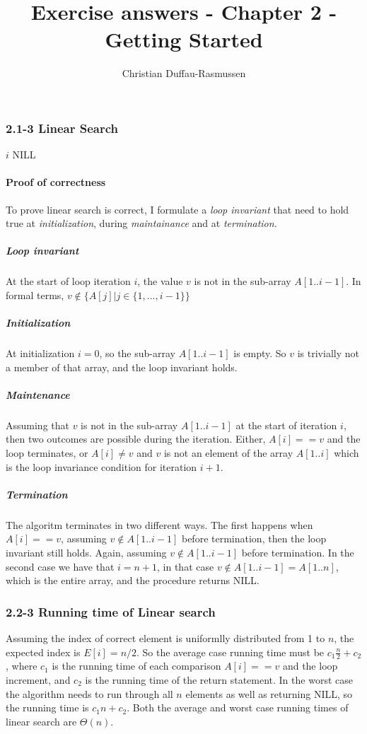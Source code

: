 \documentclass{article}
\title{Exercise answers - Chapter 2 - Getting Started}
\author{Christian Duffau-Rasmussen}
\let\oldReturn\Return
\renewcommand{\Return}{\State\oldReturn}
\begin{document}
\subsubsection*{2.1-3 Linear Search}

\begin{algorithmic}[1]
		\Return $i$
	\EndIf
\EndFor
\Return NILL
\EndProcedure
\end{algorithmic}

\paragraph{Proof of correctness}

To prove linear search is correct, I formulate a \emph{loop invariant} that need to hold true at \emph{initialization}, during \emph{maintainance} and at \emph{termination}.

\subparagraph{Loop invariant} At the start of loop iteration $i$, the value $v$ is not in the sub-array $A[1..i-1]$. In formal terms, $v \notin \{ A[j] \vert j\in\{1,...,i-1\} \}$

\subparagraph{Initialization} At initialization $i=0$, so the sub-array $A[1..i-1]$ is empty. So $v$ is trivially not a member of that array, and the loop invariant holds.

\subparagraph{Maintenance} Assuming that $v$ is not in the sub-array $A[1..i-1]$ at the start of iteration $i$, then two outcomes are possible during the iteration. Either, $A[i] == v$ and the loop terminates, or $A[i]\neq v$ and $v$ is not an element of the array $A[1..i]$ which is the loop invariance condition for iteration $i+1$.

\subparagraph{Termination} The algoritm terminates in two different ways. The first happens when $A[i] == v$, assuming $v \notin A[1..i-1]$ before termination, then the loop invariant still holds. Again, assuming $v \notin A[1..i-1]$ before termination. In the second case we have that $i=n+1$, in that case $v \notin A[1..i-1]=A[1..n]$, which is the entire array, and the procedure returns NILL.

\subsubsection*{2.2-3 Running time of Linear search}
Assuming the index of correct element is uniformlly distributed from 1 to $n$, the expected index is $E[i] = n/2$. So the average case running time must be $c_1\frac{n}{2} + c_2$, where $c_1$ is the running time of each comparison $A[i]==v$ and the loop increment,  and $c_2$ is the running time of the return statement. In the worst case the algorithm needs to run through all $n$ elements as well as returning NILL, so the running time is $c_1n + c_2$.  
Both the average and worst case running times of linear search are $\Theta(n)$.
\end{document}
